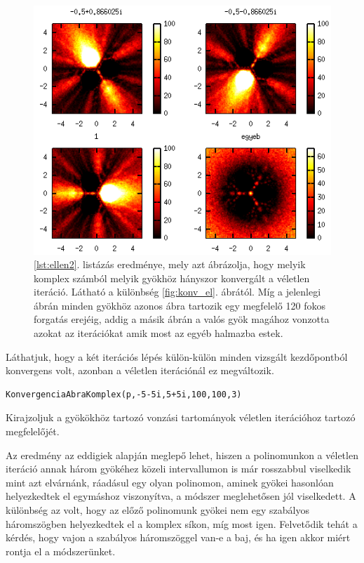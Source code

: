 \documentclass[a4paper,12pt]{report}
\begin{document}
		    \begin{figure}[hp]
					\centering
					\includegraphics[scale=0.6]{veletlen.png}
					\caption{\ref{lst:ellen2}. listázás eredménye, mely azt ábrázolja, hogy melyik komplex számból melyik gyökhöz hányszor konvergált a véletlen iteráció. Látható a különbség \ref{fig:konv_el}. ábrától. Míg a jelenlegi ábrán minden gyökhöz azonos ábra tartozik egy megfelelő 120 fokos forgatás erejéig, addig a másik ábrán a valós gyök magához vonzotta azokat az iterációkat amik most az egyéb halmazba estek.}
				\end{figure}
                Láthatjuk, hogy a két iterációs lépés külön-külön minden vizsgált kezdőpontból konvergens volt, azonban a véletlen iterációnál ez megváltozik.
                \begin{singlespace}
                \begin{lstlisting}[caption=Bemenet,label=lst:ellen2]
KonvergenciaAbraKomplex(p,-5-5i,5+5i,100,100,3)
                \end{lstlisting}
                \end{singlespace}
                Kirajzoljuk a gyökökhöz tartozó vonzási tartományok véletlen iterációhoz tartozó megfelelőjét.
                


Az eredmény az eddigiek alapján meglepő lehet, hiszen a polinomunkon a véletlen iteráció annak három gyökéhez közeli intervallumon is már rosszabbul viselkedik mint azt elvárnánk, ráadásul egy olyan polinomon, aminek gyökei hasonlóan helyezkedtek el egymáshoz viszonyítva, a módszer meglehetősen jól viselkedett. A különbség az volt, hogy az előző polinomunk gyökei nem egy szabályos háromszögben helyezkedtek el a komplex síkon, míg most igen. Felvetődik tehát a kérdés, hogy vajon a szabályos háromszöggel van-e a baj, és ha igen akkor miért rontja el a módszerünket.
\end{document}
